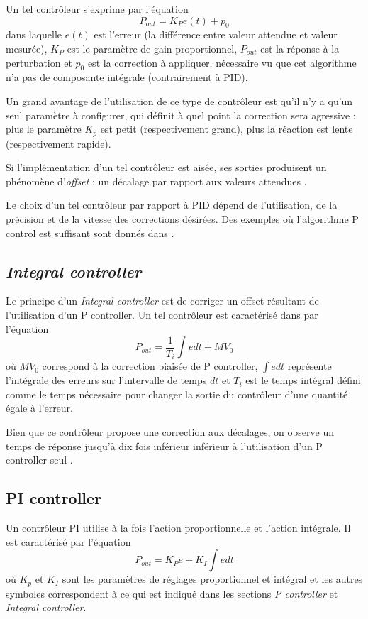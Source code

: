 \documentclass[a4paper,10pt]{report}
\begin{document}
Un tel contrôleur s'exprime par l'équation
\begin{equation}P_{out} = K_{P}e(t) + p_0\end{equation}
dans laquelle $e(t)$ est l'erreur (la différence entre valeur attendue et valeur mesurée), $K_{P}$ est le paramètre de gain proportionnel, $P_{out}$ est la réponse à la perturbation et $p_0$ est la correction à appliquer, nécessaire vu que cet algorithme n'a pas de composante intégrale (contrairement à PID).

Un grand avantage de l'utilisation de ce type de contrôleur est qu'il n'y a qu'un seul paramètre à configurer, qui définit à quel point la correction sera agressive : plus le paramètre $K_{p}$ est petit (respectivement grand), plus la réaction est lente (respectivement rapide).

Si l'implémentation d'un tel contrôleur est aisée, ses sorties produisent un phénomène d'\emph{offset} : un décalage par rapport aux valeurs attendues \cite{svrcek2014real}.

Le choix d'un tel contrôleur par rapport à PID dépend de l'utilisation, de la précision et de la vitesse des corrections désirées.
Des exemples où l'algorithme P control est suffisant sont donnés dans \cite{sellers2001overview}.

\subsection{\emph{Integral controller}}
Le principe d'un \emph{Integral controller} est de corriger un offset résultant de l'utilisation d'un P controller.
Un tel contrôleur est caractérisé dans \cite{svrcek2014real} par l'équation
\begin{equation}P_{out} = \frac{1}{T_{i}}\int e dt + MV_{0}\end{equation}
où $MV_{0}$ correspond à la correction biaisée de P controller,
$\int e dt$ représente l'intégrale des erreurs sur l'intervalle de temps $dt$ et $T_{i}$ est le temps intégral défini comme le temps nécessaire pour changer la sortie du contrôleur d'une quantité égale à l'erreur.

Bien que ce contrôleur propose une correction aux décalages, on observe un temps de réponse jusqu'à dix fois inférieur inférieur à l'utilisation d'un P controller seul \cite{svrcek2014real}.

\subsection{PI controller}
Un contrôleur PI utilise à la fois l'action proportionnelle et l'action intégrale.
Il est caractérisé par l'équation
\begin{equation}P_{out} = K_{P} e + K_{I} \int e dt\end{equation}
où $K_{p}$ et $K_{I}$ sont les paramètres de réglages proportionnel et intégral
et les autres symboles correspondent à ce qui est indiqué dans les sections \emph{P controller} et \emph{Integral controller}.
\end{document}
